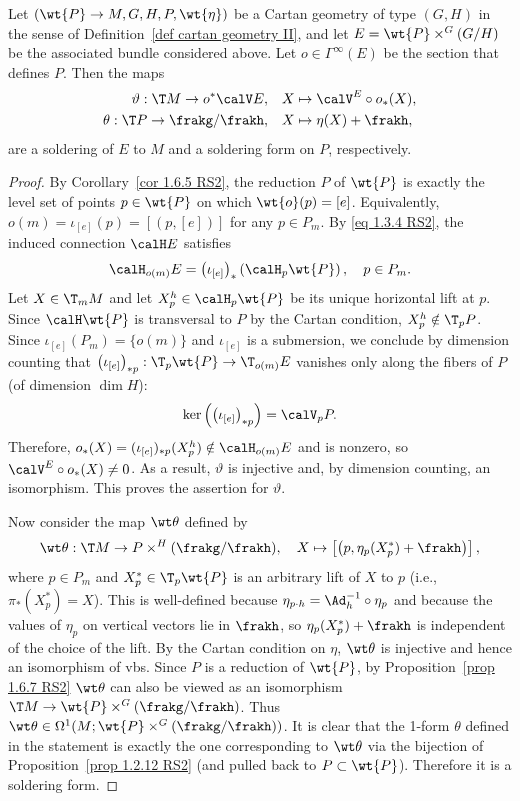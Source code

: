 \begin{prop}
    Let $(\wt{P}\to M,G,H,P,\wt{\eta})$ be a Cartan geometry of type $(G,H)$ in the sense of Definition~\ref{def cartan geometry II}, and let $E=\wt{P}\times^G (G\slash H)$ be the associated bundle considered above. Let $o\in\Gamma^\infty(E)$ be the section that defines $P$. Then the maps
    \begin{align}
        \vartheta: \T M\to o^\ast\calV E,\quad &X\mapsto \calV^E\circ o_\ast(X),\\
        \theta:\T P\to \frakg\slash\frakh, \quad &X\mapsto \eta(X)+\frakh,
    \end{align}
    are a soldering of $E$ to $M$ and a soldering form on $P$, respectively.
\end{prop}
\begin{proof}
    By Corollary~\ref{cor 1.6.5 RS2}, the reduction $P$ of $\wt{P}$ is exactly the level set of points $p\in\wt{P}$ on which $\wt{o}(p)=[e]$. Equivalently, $o(m)=\iota_{[e]}(p)=[(p,[e])]$ for any $p\in P_m$. By \eqref{eq 1.3.4 RS2}, the induced connection $\calH E$ satisfies 
    \[\calH_{o(m)}E=\left(\iota_{[e]}\right)_\ast\left(\calH_p \wt{P}\right),\quad p\in P_m.\]
    Let $X\in \T_mM$ and let $X^h_p\in \calH_p \wt{P}$ be its unique horizontal lift at $p$. Since $\calH \wt{P}$ is transversal to $P$ by the Cartan condition, $X^h_p\notin \T_p P$. Since $\iota_{[e]}(P_m)=\{o(m)\}$ and $\iota_{[e]}$ is a submersion, we conclude by dimension counting that $\left(\iota_{[e]}\right)_{\ast p}:\T_p\wt{P}\to \T_{o(m)}E$ vanishes only along the fibers of $P$ (of dimension $\dim H$):
    \[\ker\left(\left(\iota_{[e]}\right)_{\ast p}\right)=\calV_p P.\]
    Therefore, $o_\ast(X)=(\iota_{[e]})_{\ast p}(X_p^h)\notin \calH_{o(m)}E$ and is nonzero, so $\calV^E\circ o_\ast(X)\neq 0$. As a result, $\vartheta$ is injective and, by dimension counting, an isomorphism. This proves the assertion for $\vartheta$.

    Now consider the map $\wt\theta$ defined by 
    \[\wt\theta:\T M\to P\times^H (\frakg\slash\frakh),\quad X\mapsto \left[\left(p,\eta_p(X^\ast_p)+\frakh\right)\right],\]
    where $p\in P_m$ and $X^\ast_p\in \T_p\wt{P}$ is an arbitrary lift of $X$ to $p$ (i.e., $\pi_\ast(X^\ast_p)=X$). This is well-defined because $\eta_{p\cdot h}=\Ad_h^{-1}\circ\eta_p$ and because the values of $\eta_p$ on vertical vectors lie in $\frakh$, so $\eta_p(X^\ast_p)+\frakh$ is independent of the choice of the lift. By the Cartan condition on $\eta$, $\wt\theta$ is injective and hence an isomorphism of \glspl{vb}. Since $P$ is a reduction of $\wt{P}$, by Proposition~\ref{prop 1.6.7 RS2} $\wt\theta$ can also be viewed as an isomorphism $\T M\to \wt{P}\times^G (\frakg\slash\frakh)$. Thus $\wt\theta\in\Omega^1(M;\wt{P}\times^G (\frakg\slash\frakh))$. It is clear that the 1-form $\theta$ defined in the statement is exactly the one corresponding to $\wt\theta$ via the bijection of Proposition~\ref{prop 1.2.12 RS2} (and pulled back to $P\subset \wt{P}$). Therefore it is a soldering form.
\end{proof}


